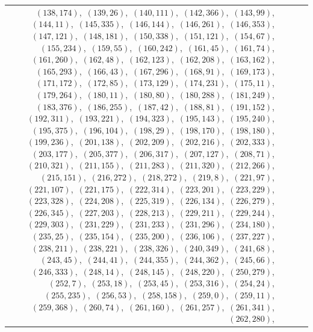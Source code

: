 \documentclass[11pt]{article}
\begin{document}
\begin{longtable}{@{}rrl>{\raggedright\arraybackslash}p{}@{}}
$(138,174)$,\allowbreak\ $(139,26)$,\allowbreak\ $(140,111)$,\allowbreak\ $(142,366)$,\allowbreak\ $(143,99)$,\allowbreak\ $(144,11)$,\allowbreak\ $(145,335)$,\allowbreak\ $(146,144)$,\allowbreak\ $(146,261)$,\allowbreak\ $(146,353)$,\allowbreak\ $(147,121)$,\allowbreak\ $(148,181)$,\allowbreak\ $(150,338)$,\allowbreak\ $(151,121)$,\allowbreak\ $(154,67)$,\allowbreak\ $(155,234)$,\allowbreak\ $(159,55)$,\allowbreak\ $(160,242)$,\allowbreak\ $(161,45)$,\allowbreak\ $(161,74)$,\allowbreak\ $(161,260)$,\allowbreak\ $(162,48)$,\allowbreak\ $(162,123)$,\allowbreak\ $(162,208)$,\allowbreak\ $(163,162)$,\allowbreak\ $(165,293)$,\allowbreak\ $(166,43)$,\allowbreak\ $(167,296)$,\allowbreak\ $(168,91)$,\allowbreak\ $(169,173)$,\allowbreak\ $(171,172)$,\allowbreak\ $(172,85)$,\allowbreak\ $(173,129)$,\allowbreak\ $(174,231)$,\allowbreak\ $(175,11)$,\allowbreak\ $(179,264)$,\allowbreak\ $(180,11)$,\allowbreak\ $(180,80)$,\allowbreak\ $(180,288)$,\allowbreak\ $(181,249)$,\allowbreak\ $(183,376)$,\allowbreak\ $(186,255)$,\allowbreak\ $(187,42)$,\allowbreak\ $(188,81)$,\allowbreak\ $(191,152)$,\allowbreak\ $(192,311)$,\allowbreak\ $(193,221)$,\allowbreak\ $(194,323)$,\allowbreak\ $(195,143)$,\allowbreak\ $(195,240)$,\allowbreak\ $(195,375)$,\allowbreak\ $(196,104)$,\allowbreak\ $(198,29)$,\allowbreak\ $(198,170)$,\allowbreak\ $(198,180)$,\allowbreak\ $(199,236)$,\allowbreak\ $(201,138)$,\allowbreak\ $(202,209)$,\allowbreak\ $(202,216)$,\allowbreak\ $(202,333)$,\allowbreak\ $(203,177)$,\allowbreak\ $(205,377)$,\allowbreak\ $(206,317)$,\allowbreak\ $(207,127)$,\allowbreak\ $(208,71)$,\allowbreak\ $(210,321)$,\allowbreak\ $(211,155)$,\allowbreak\ $(211,283)$,\allowbreak\ $(211,320)$,\allowbreak\ $(212,266)$,\allowbreak\ $(215,151)$,\allowbreak\ $(216,272)$,\allowbreak\ $(218,272)$,\allowbreak\ $(219,8)$,\allowbreak\ $(221,97)$,\allowbreak\ $(221,107)$,\allowbreak\ $(221,175)$,\allowbreak\ $(222,314)$,\allowbreak\ $(223,201)$,\allowbreak\ $(223,229)$,\allowbreak\ $(223,328)$,\allowbreak\ $(224,208)$,\allowbreak\ $(225,319)$,\allowbreak\ $(226,134)$,\allowbreak\ $(226,279)$,\allowbreak\ $(226,345)$,\allowbreak\ $(227,203)$,\allowbreak\ $(228,213)$,\allowbreak\ $(229,211)$,\allowbreak\ $(229,244)$,\allowbreak\ $(229,303)$,\allowbreak\ $(231,229)$,\allowbreak\ $(231,233)$,\allowbreak\ $(231,296)$,\allowbreak\ $(234,180)$,\allowbreak\ $(235,25)$,\allowbreak\ $(235,154)$,\allowbreak\ $(235,200)$,\allowbreak\ $(236,106)$,\allowbreak\ $(237,227)$,\allowbreak\ $(238,211)$,\allowbreak\ $(238,221)$,\allowbreak\ $(238,326)$,\allowbreak\ $(240,349)$,\allowbreak\ $(241,68)$,\allowbreak\ $(243,45)$,\allowbreak\ $(244,41)$,\allowbreak\ $(244,355)$,\allowbreak\ $(244,362)$,\allowbreak\ $(245,66)$,\allowbreak\ $(246,333)$,\allowbreak\ $(248,14)$,\allowbreak\ $(248,145)$,\allowbreak\ $(248,220)$,\allowbreak\ $(250,279)$,\allowbreak\ $(252,7)$,\allowbreak\ $(253,18)$,\allowbreak\ $(253,45)$,\allowbreak\ $(253,316)$,\allowbreak\ $(254,24)$,\allowbreak\ $(255,235)$,\allowbreak\ $(256,53)$,\allowbreak\ $(258,158)$,\allowbreak\ $(259,0)$,\allowbreak\ $(259,11)$,\allowbreak\ $(259,368)$,\allowbreak\ $(260,74)$,\allowbreak\ $(261,160)$,\allowbreak\ $(261,257)$,\allowbreak\ $(261,341)$,\allowbreak\ $(262,280)$,\allowbreak\ 
\end{longtable}
\end{document}
